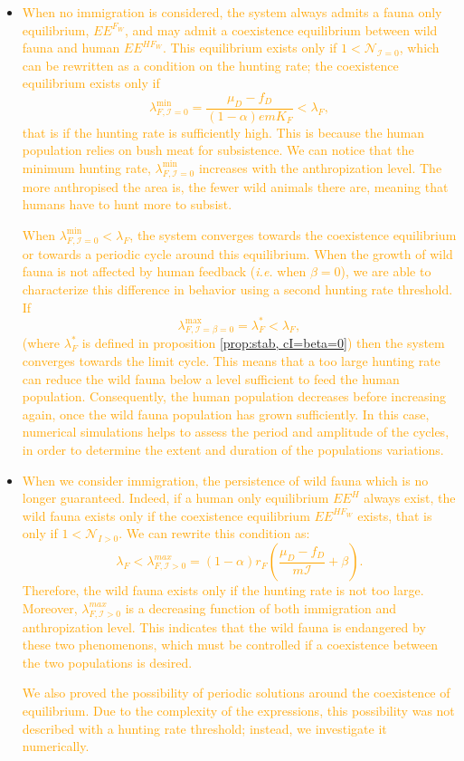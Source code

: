 \documentclass{article}
\newcommand{\lfw}{\lambda_{F}}
\newcommand{\lfw}{\lambda_{F}}
\newcommand{\cI}{\mathcal{I}}
\newcommand{\N}{\mathcal{N}}
\newcommand{\vdeux}[1]{\textcolor{orange}{#1}}
\theoremstyle{definition}
\theoremstyle{remark}
\begin{document}
\begin{itemize}
\item \vdeux{When no immigration is considered, the system always admits a fauna only equilibrium, $EE^{F_W}$, and may admit a coexistence equilibrium between wild fauna and human $EE^{HF_W}$. This equilibrium exists only if $1 < \N_{\cI = 0}$, which can be rewritten as a condition on the hunting rate; the coexistence equilibrium exists only if 
$$
\lambda_{F, \cI = 0}^{\min} = \dfrac{\mu_D - f_D}{(1-\alpha) e m K_F} < \lfw,
$$ that is if the hunting rate is sufficiently high. 
This is because the human population relies on bush meat for subsistence. We can notice that the minimum hunting rate, $\lambda_{F, \cI = 0}^{\min}$ increases with the anthropization level. The more anthropised the area is, the fewer wild animals there are, meaning that humans have to hunt more to subsist.
}

\vdeux{
When $\lambda_{F, \cI = 0}^{\min} < \lfw $, the system converges towards the coexistence equilibrium or towards a periodic cycle around this equilibrium. When the growth of wild fauna is not affected by human feedback (\textit{i.e.} when $\beta = 0$), we are able to characterize this difference in behavior using a second hunting rate threshold. If 
$$
\lambda_{F, \cI=\beta=0}^{\max} = \lfw^* < \lfw,
$$ (where $\lfw^*$ is defined in proposition \ref{prop:stab, cI=beta=0}) then the system converges towards the limit cycle. This means that a too large hunting rate can reduce the wild fauna below a level sufficient to feed the human population. Consequently, the human population decreases before increasing again, once the wild fauna population has grown sufficiently. In this case, numerical simulations helps to assess the period and amplitude of the cycles, in order to determine the extent and duration of the populations variations.
}

\item \vdeux{When we consider immigration, the persistence of wild fauna which is no longer guaranteed. Indeed, if a human only equilibrium $EE^{H}$ always exist, the wild fauna exists only if the coexistence equilibrium $EE^{HF_W}$ exists, that is only if $1 < \N_{I>0}$. We can rewrite this condition as:
$$
\lfw < \lambda_{F, \cI > 0}^{max} = (1-\alpha) r_F\left(\dfrac{\mu_D - f_D}{m \cI} + \beta \right).
$$
Therefore, the wild fauna exists only if the hunting rate is not too large. Moreover, $\lambda_{F, \cI > 0}^{max}$ is a decreasing function of both immigration and anthropization level. This indicates that the wild fauna is endangered by these two phenomenons, which must be controlled if a coexistence between the two populations is desired.
}

\vdeux{
We also proved the possibility of periodic solutions around the coexistence of equilibrium. Due to the complexity of the expressions, this possibility was not described with a hunting rate threshold; instead, we investigate it numerically.
}
\end{itemize}
\end{document}
